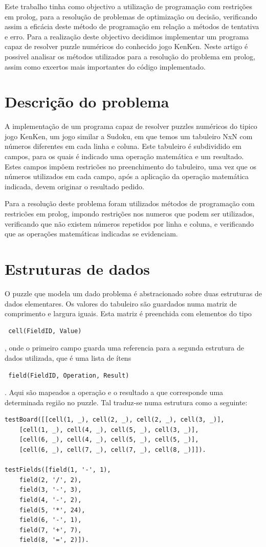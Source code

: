\documentclass[runningheads,a4paper]{llncs}
\begin{document}
Este trabalho tinha como objectivo a utilização de programação com restrições em prolog, para a resolução de problemas de optimização ou decisão, verificando assim a eficácia deste método de programação em relação a métodos de tentativa e erro.
Para a realização deste objectivo decidimos implementar um programa capaz de resolver puzzle numéricos do conhecido jogo KenKen.
Neste artigo é possivel analisar os métodos utilizados para a resolução do problema em prolog, assim como excertos mais importantes do código implementado.


\section{Descrição do problema}
A implementação de um programa capaz de resolver puzzles numéricos do tipico jogo KenKen, um jogo similar a Sudoku, em que temos um tabuleiro NxN com números diferentes em cada linha e coluna. Este tabuleiro é subdividido em campos, para os quais é indicado uma operação matemática e um resultado. Estes campos impôem restricões no preenchimento do tabuleiro, uma vez que os números utilizados em cada campo, após a aplicação da operação matemática indicada, devem originar o resultado pedido.


Para a resolução deste problema foram utilizados métodos de programação com restricões em prolog, impondo restrições nos numeros que podem ser utilizados, verificando que não existem números repetidos por linha e coluna, e verificando que as operações matemáticas indicadas se evidenciam.

\newpage

\section{Estruturas de dados}
O puzzle que modela um dado problema é abstracionado sobre duas estruturas de dados elementares.
Os valores do tabuleiro são guardados numa matriz de comprimento e largura iguais. Esta matriz é preenchida
com elementos do tipo \begin{verbatim} cell(FieldID, Value) \end{verbatim}, onde o primeiro campo guarda uma
referencia para a segunda estrutura de dados utilizada, que é uma lista de ítens 
\begin{verbatim} field(FieldID, Operation, Result) \end{verbatim}. Aqui são mapeados a operação e o resultado a que corresponde uma determinada região no puzzle. Tal traduz-se numa estrutura como a seguinte:
\begin{verbatim}
testBoard([[cell(1, _), cell(2, _), cell(2, _), cell(3, _)],
	[cell(1, _), cell(4, _), cell(5, _), cell(3, _)],
	[cell(6, _), cell(4, _), cell(5, _), cell(5, _)],
	[cell(6, _), cell(7, _), cell(7, _), cell(8, _)]]).
	
testFields([field(1, '-', 1),
	field(2, '/', 2),
	field(3, '-', 3),
	field(4, '-', 2),
	field(5, '*', 24),
	field(6, '-', 1),
	field(7, '+', 7),
	field(8, '=', 2)]).
\end{verbatim}
\end{document}
